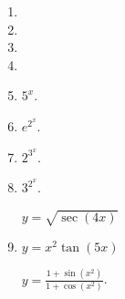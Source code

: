 \begin{multicols}{2}
\begin{enumerate}[ref={\fcProblemRef}]
\item 
\item 
\item 
\item 
\item $5^{x}$.

\item $e^{2^x}$.


\item $2^{3^x}$.

\item $3^{2^x}$.

 \label{problemd/dx(sqrt(sec(4x)))}  $y = \sqrt{\sec (4x)}$

\item \label{problemd/dx(x^2tan(5x))} $y = x^2\tan (5x)$

 \label{problemd/dx((1+sin(x^2))/(1+cos(x^2)))}  $\displaystyle y = \frac{1+\sin \left(x^2\right)}{1+\cos \left(x^2\right)}$.

\end{enumerate}
\end{multicols}
